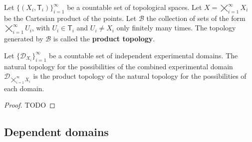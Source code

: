 \documentclass[11pt,letterpaper,fleqn]{memoir} %
\begin{document}
\begin{mathSection}
	\begin{defn}
	Let $\{(X_i, \mathsf{T}_i)\}_{i=1}^{\infty}$ be a countable set of topological spaces. Let $X=\bigtimes\limits_{i=1}^{\infty} X_i$ be the Cartesian product of the points. Let $\mathcal{B}$ the collection of sets of the form $\bigtimes\limits_{i=1}^{\infty} U_{i}$, with $U_i \in \mathsf{T}_i$ and $U_i \neq X_i$ only finitely many times. The topology generated by $\mathcal{B}$ is called the \textbf{product topology}.
\end{defn}
	\begin{prop}
	Let $\{\mathcal{D}_{X_i}\}_{i=1}^{\infty}$ be a countable set of independent experimental domains. The natural topology for the possibilities of the combined experimental domain $\mathcal{D}_{\bigtimes\limits_{i=1}^{\infty} X_i}$ is the product topology of the natural topology for the possibilities of each domain.
\end{prop}
\begin{proof}
	TODO
\end{proof}
\end{mathSection}

\subsection{Dependent domains}
\end{document}
